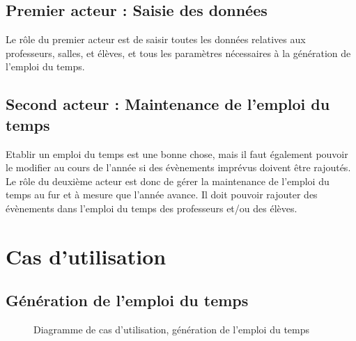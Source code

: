 \documentclass[12pt,a4paper,french]{article}
\begin{document}
\subsection{Premier acteur : Saisie des données}
Le rôle du premier acteur est de saisir toutes les données relatives aux professeurs, salles, et élèves, et tous les paramètres nécessaires à la génération de l'emploi du temps.
        
\subsection{Second acteur : Maintenance de l'emploi du temps}
Etablir un emploi du temps est une bonne chose, mais il faut  également pouvoir le modifier au cours de l'année si des évènements imprévus doivent être rajoutés.
Le rôle du deuxième acteur est donc de gérer la maintenance de l'emploi du temps au fur et à mesure que l'année avance. Il doit pouvoir rajouter des évènements dans l'emploi du temps des professeurs et/ou des élèves.


\newpage
\section{Cas d'utilisation}
\subsection{Génération de l'emploi du temps}    
\begin{figure}[! ht ]
    \centering
    \begin{minipage}[t]{14 cm}
        \centering
        \caption {Diagramme de cas d'utilisation, génération de l'emploi du temps}
    \end{minipage}
\end{figure}
            
\end{document}
